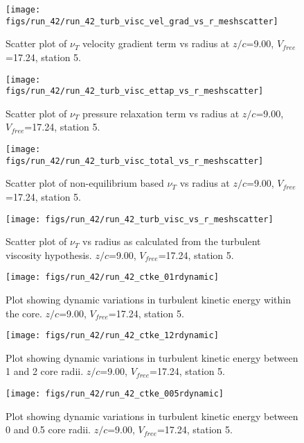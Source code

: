 \begin{figure}[H]
\centering
\texttt{[image: figs/run\_42/run\_42\_turb\_visc\_vel\_grad\_vs\_r\_meshscatter]}
\caption{Scatter plot of $\nu_T$ velocity gradient term vs radius at $z/c$=9.00, $V_{free}$=17.24, station 5.}
\end{figure}


\begin{figure}[H]
\centering
\texttt{[image: figs/run\_42/run\_42\_turb\_visc\_ettap\_vs\_r\_meshscatter]}
\caption{Scatter plot of $\nu_T$ pressure relaxation term vs radius at $z/c$=9.00, $V_{free}$=17.24, station 5.}
\end{figure}


\begin{figure}[H]
\centering
\texttt{[image: figs/run\_42/run\_42\_turb\_visc\_total\_vs\_r\_meshscatter]}
\caption{Scatter plot of non-equilibrium based $\nu_T$ vs radius at $z/c$=9.00, $V_{free}$=17.24, station 5.}
\end{figure}


\begin{figure}[H]
\centering
\texttt{[image: figs/run\_42/run\_42\_turb\_visc\_vs\_r\_meshscatter]}
\caption{Scatter plot of $\nu_T$ vs radius as calculated from the turbulent viscosity hypothesis. $z/c$=9.00, $V_{free}$=17.24, station 5.}
\end{figure}


\begin{figure}[H]
\centering
\texttt{[image: figs/run\_42/run\_42\_ctke\_01rdynamic]}
\caption{Plot showing dynamic variations in turbulent kinetic energy within the core. $z/c$=9.00, $V_{free}$=17.24, station 5.}
\end{figure}


\begin{figure}[H]
\centering
\texttt{[image: figs/run\_42/run\_42\_ctke\_12rdynamic]}
\caption{Plot showing dynamic variations in turbulent kinetic energy between 1 and 2 core radii. $z/c$=9.00, $V_{free}$=17.24, station 5.}
\end{figure}


\begin{figure}[H]
\centering
\texttt{[image: figs/run\_42/run\_42\_ctke\_005rdynamic]}
\caption{Plot showing dynamic variations in turbulent kinetic energy between 0 and 0.5 core radii. $z/c$=9.00, $V_{free}$=17.24, station 5.}
\end{figure}


